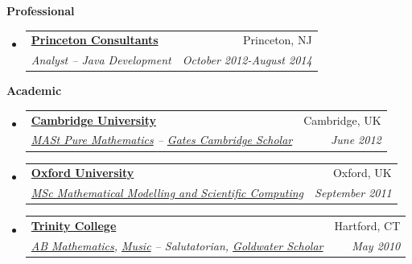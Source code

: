 \documentclass[letterpaper,11pt]{article}
\makeatletter
\newcommand{\resitem}[1]{\item #1 \vspace{-1pt}}
\newcommand{\resheading}[1]{{\large \colorbox{mygrey}{\begin{minipage}{\textwidth}{\textbf{#1 \vphantom{p\^{E}}}}\end{minipage}}}}
\newcommand{\ressubheading}[4]{
\begin{tabular*}{6.5in}{l@{\extracolsep{\fill}}r}
		\textbf{#1} & #2 \\
		\textit{#3} & \textit{#4} \\
\end{tabular*}\vspace{-6pt}}
\makeatother
\begin{document}
\resheading{\Large{Professional}}
\large
	\begin{itemize}
		\item
			\ressubheading{\href{http://www.princeton.com/}{Princeton Consultants}}{Princeton, NJ}{Analyst -- Java Development} {October 2012-August 2014}

	\end{itemize} 
\resheading{\Large{Academic}}
\large
	\begin{itemize}
		\item
			\ressubheading{\href{http://www.cam.ac.uk/}{Cambridge University}}{Cambridge, UK}{\href{http://www.maths.cam.ac.uk/postgrad/mathiii/}{MASt Pure Mathematics} -- \href{http://www.gatescambridge.org/our-scholars/Profile.aspx?ScholarID=5646}{Gates Cambridge Scholar}} {June 2012}
		\item
			\ressubheading{\href{http://www.ox.ac.uk}{Oxford University}}{Oxford, UK}{\href{http://www.maths.ox.ac.uk/current-students/graduates/courses/mscmmsc}{MSc Mathematical Modelling and Scientific Computing}} {September 2011}

			
		\item
			\ressubheading{\href{http://www.trincoll.edu/}{Trinity College}}{Hartford, CT}{{\href{http://www.trincoll.edu/Academics/MajorsAndMinors/Mathematics/Pages/default.aspx}{AB Mathematics,}} {\href{http://www.trincoll.edu/Academics/MajorsAndMinors/Music/Pages/default.aspx}{Music} -- Salutatorian, \href{http://www.act.org/goldwater/}{Goldwater Scholar}}}{May 2010}

	\end{itemize} 
	
	
%		
	
\end{document}
